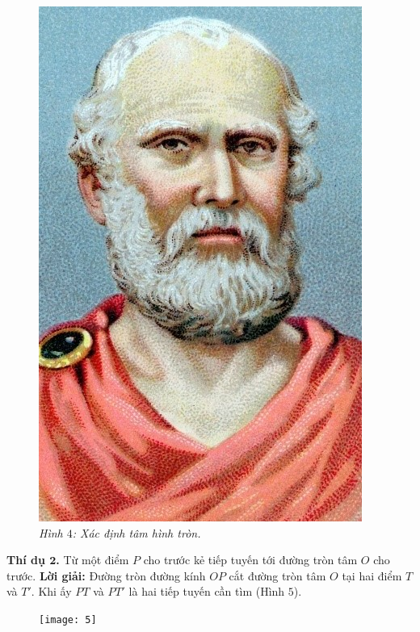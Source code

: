 \begin{multicols}{2}
{\begin{figure}[H]
		\includegraphics[width=1\linewidth]{4}
		\caption{\small\textit{\color{lichsutoanhoc}Hình $4$: Xác định tâm hình tròn.}}
		\vspace*{-10pt}
	\end{figure}
	\textbf{Thí dụ $\pmb{2}$.} Từ một điểm $P$ cho trước kẻ tiếp tuyến tới đường tròn tâm  $O$ cho trước.
	\vskip 0.1cm
	\textbf{Lời giải:} Đường tròn đường kính $OP$  cắt đường tròn tâm $O$  tại hai điểm $T$   và $T'$.  Khi ấy $PT$  và $PT'$  là hai tiếp tuyến cần tìm (Hình $5$).
	\begin{figure}[H]
		\centering
		\vspace*{-5pt}
		\captionsetup{labelformat= empty, justification=centering}
		\texttt{[image: 5]}

\end{figure}}
\end{multicols}
